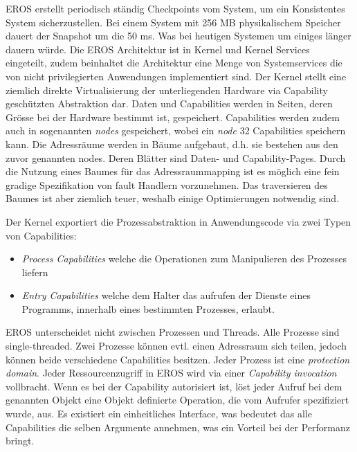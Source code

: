 \documentclass[11pt,technote]{IEEEtran}
\begin{document}
      EROS erstellt periodisch st\"andig Checkpoints vom System, um ein Konsistentes System sicherzustellen. Bei einem System mit 256 MB physikalischem Speicher
      dauert der Snapshot um die 50 ms. Was bei heutigen Systemen um einiges l\"anger dauern w\"urde.
      Die EROS Architektur ist in Kernel und Kernel Services eingeteilt, zudem beinhaltet die Architektur eine Menge von Systemservices
      die von nicht privilegierten Anwendungen implementiert sind.
      Der Kernel stellt eine ziemlich direkte Virtualisierung der unterliegenden Hardware via Capability gesch\"utzten Abstraktion dar.
      Daten und Capabilities werden in Seiten, deren Gr\"osse bei der Hardware bestimmt ist, gespeichert. 
      Capabilities werden zudem auch in sogenannten \textit{nodes} gespeichert, wobei ein \textit{node} 32 Capabilities speichern kann.
      Die Adressr\"aume werden in B\"aume aufgebaut, d.h. sie bestehen aus den zuvor genannten nodes. Deren Bl\"atter sind Daten- und Capability-Pages.
      Durch die Nutzung eines Baumes f\"ur das Adressraummapping ist es m\"oglich eine fein gradige Spezifikation von fault Handlern vorzunehmen.
      Das traversieren des Baumes ist aber ziemlich teuer, weshalb einige Optimierungen notwendig sind. 
        
      Der Kernel exportiert die Prozessabstraktion in Anwendungscode via zwei Typen von Capabilities:
      \begin{itemize}
        \item \textit{Process Capabilities} welche die Operationen zum Manipulieren des Prozesses liefern 
        \item \textit{Entry Capabilities} welche dem Halter das aufrufen der Dienste eines Programms, innerhalb eines bestimmten Prozesses, erlaubt.
      \end{itemize}
        
      EROS unterscheidet nicht zwischen Prozessen und Threads. Alle Prozesse sind single-threaded. Zwei Prozesse k\"onnen evtl. einen Adressraum sich teilen,
      jedoch k\"onnen beide verschiedene Capabilities besitzen. Jeder Prozess ist eine \textit{protection domain}.
      Jeder Ressourcenzugriff in EROS wird via einer \textit{Capability invocation} vollbracht. Wenn es bei der Capability autorisiert ist,
      l\"ost jeder Aufruf bei dem genannten Objekt eine Objekt definierte Operation, die vom Aufrufer spezifiziert wurde, aus. 
      Es existiert ein einheitliches Interface, was bedeutet das alle Capabilities die selben Argumente annehmen,
      was ein Vorteil bei der Performanz bringt.
        
\end{document}
